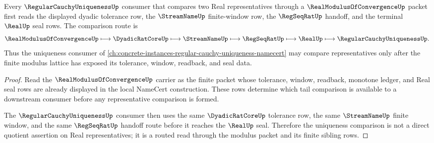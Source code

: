 \begin{theorem}
\label{thm:real-modulus-regular-cauchy-uniqueness-forward-route}
Every $\RegularCauchyUniquenessUp$ consumer that compares two Real representatives through a $\RealModulusOfConvergenceUp$ packet first reads the displayed dyadic tolerance row, the $\StreamNameUp$ finite-window row, the $\RegSeqRatUp$ handoff, and the terminal $\RealUp$ seal rows. The comparison route is
$$
\RealModulusOfConvergenceUp \longmapsto \DyadicRatCoreUp \longmapsto \StreamNameUp \longmapsto \RegSeqRatUp \longmapsto \RealUp \longmapsto \RegularCauchyUniquenessUp .
$$
Thus the uniqueness consumer of \autoref{ch:concrete-instances-regular-cauchy-uniqueness-namecert} may compare representatives only after the finite modulus lattice has exposed its tolerance, window, readback, and seal data.
\end{theorem}

\begin{proof}
Read the $\RealModulusOfConvergenceUp$ carrier as the finite packet whose tolerance, window, readback, monotone ledger, and Real seal rows are already displayed in the local NameCert construction. These rows determine which tail comparison is available to a downstream consumer before any representative comparison is formed.

The $\RegularCauchyUniquenessUp$ consumer then uses the same $\DyadicRatCoreUp$ tolerance row, the same $\StreamNameUp$ finite window, and the same $\RegSeqRatUp$ handoff route before it reaches the $\RealUp$ seal. Therefore the uniqueness comparison is not a direct quotient assertion on Real representatives; it is a routed read through the modulus packet and its finite sibling rows.
\end{proof}
